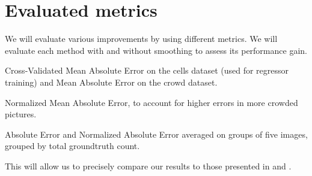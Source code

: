 \documentclass[a4paper,11pt, french]{article}
\begin{document}
\section*{Evaluated metrics}
We will evaluate various improvements by using different metrics. We will evaluate each method with and without smoothing to assess its performance gain.
\begin{description}
\item Cross-Validated Mean Absolute Error on the cells dataset (used for regressor training) and Mean Absolute Error on the crowd dataset.
\item Normalized Mean Absolute Error, to account for higher errors in more crowded pictures.
\item Absolute Error and Normalized Absolute Error averaged on groups of five images, grouped by total groundtruth count.
\end{description}
This will allow us to precisely compare our results to those presented in \cite{basepaper} and \cite{multisource}.


\end{document}

